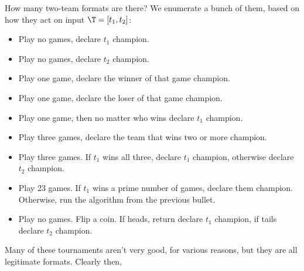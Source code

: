 {    How many two-team formats are there? We enumerate a bunch of them, based on how they act on input $\T = [t_1, t_2]$:
    \begin{itemize}
        \item Play no games, declare $t_1$ champion.
        \item Play no games, declare $t_2$ champion.
        \item Play one game, declare the winner of that game champion.
        \item Play one game, declare the loser of that game champion.
        \item Play one game, then no matter who wins declare $t_1$ champion.
        \item Play three games, declare the team that wins two or more champion.
        \item Play three games. If $t_1$ wins all three, declare $t_1$ champion, otherwise declare $t_2$ champion.
        \item Play 23 games. If $t_1$ wins a prime number of games, declare them champion. Otherwise, run the algorithm from the previous bullet.
        \item Play no games. Flip a coin. If heads, return declare $t_1$ champion, if tails declare $t_2$ champion.
    \end{itemize}

    Many of these tournaments aren't very good, for various reasons, but they are all legitimate formats. Clearly then,





}